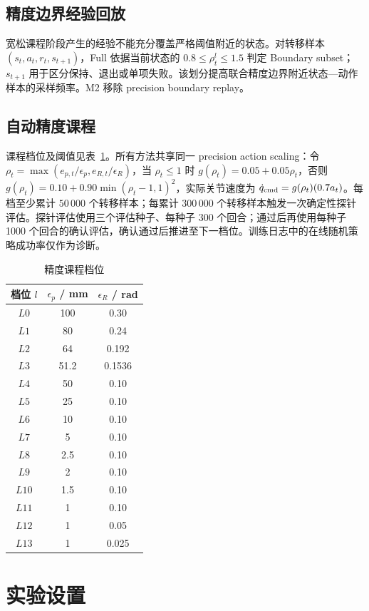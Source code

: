 \documentclass[conference]{IEEEtran}
\begin{document}
\subsection{精度边界经验回放}
宽松课程阶段产生的经验不能充分覆盖严格阈值附近的状态。对转移样本 $(s_t,a_t,r_t,s_{t+1})$，Full 依据当前状态的 $0.8\leq\rho_t^l\leq1.5$ 判定 Boundary subset；$s_{t+1}$ 用于区分保持、退出或单项失败。该划分提高联合精度边界附近状态—动作样本的采样频率。M2 移除 precision boundary replay。

\subsection{自动精度课程}
课程档位及阈值见表~\ref{tab:levels}。所有方法共享同一 precision action scaling：令 $\rho_t=\max(e_{p,t}/\epsilon_p,e_{R,t}/\epsilon_R)$，当 $\rho_t\leq1$ 时 $g(\rho_t)=0.05+0.05\rho_t$，否则 $g(\rho_t)=0.10+0.90\min(\rho_t-1,1)^2$，实际关节速度为 $\dot q_{\rm cmd}=g(\rho_t)(0.7a_t)$。每档至少累计 $50\,000$ 个转移样本；每累计 $300\,000$ 个转移样本触发一次确定性探针评估。探针评估使用三个评估种子、每种子 300 个回合；通过后再使用每种子 1000 个回合的确认评估，确认通过后推进至下一档位。训练日志中的在线随机策略成功率仅作为诊断。

\begin{table}[t]
\caption{精度课程档位}
\label{tab:levels}
\centering
\small
\begin{tabular}{c|cc}
\toprule
档位 $l$ & $\epsilon_p$ / mm & $\epsilon_R$ / rad\\
\midrule
$L0$&100&0.30\\
$L1$&80&0.24\\
$L2$&64&0.192\\
$L3$&51.2&0.1536\\
$L4$&50&0.10\\
$L5$&25&0.10\\
$L6$&10&0.10\\
$L7$&5&0.10\\
$L8$&2.5&0.10\\
$L9$&2&0.10\\
$L10$&1.5&0.10\\
$L11$&1&0.10\\
$L12$&1&0.05\\
$L13$&1&0.025\\
\bottomrule
\end{tabular}
\end{table}

\section{实验设置}
\end{document}
